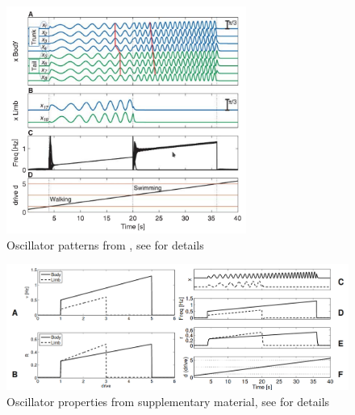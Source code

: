 \documentclass{cmc}
\begin{document}
\begin{figure}[H]
  \centering
  \includegraphics[width=0.7\textwidth]{figures/science_oscillator_patterns}
  \caption{Oscillator patterns from \cite{ijspeert2007swimming}, see
    \cite{ijspeert2007swimming} for details}
  \label{fig:science_oscillator_patterns}
\end{figure}

\begin{figure}[H]
  \centering
  \includegraphics[width=1.0\textwidth]{figures/science_oscillator_properties}
  \caption{Oscillator properties from \cite{ijspeert2007swimming} supplementary
    material, see \cite{ijspeert2007swimming} for details}
  \label{fig:science_oscillator_properties}
\end{figure}



\newpage


\label{sec:references}




\end{document}
